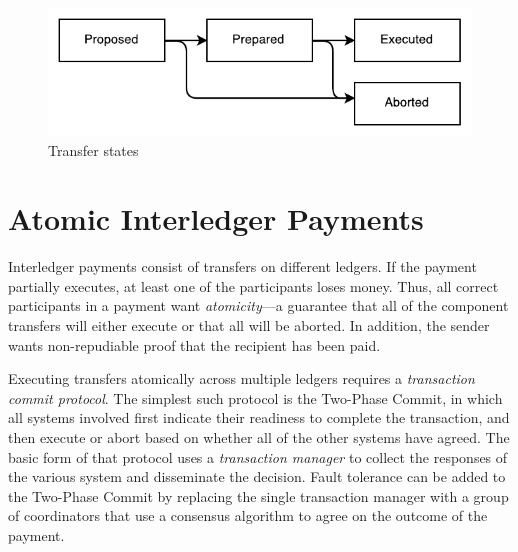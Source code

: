 \documentclass[letterpaper,twocolumn,10pt]{article}
\begin{document}
\begin{figure}[ht]
    \centering
    \includegraphics[width=\columnwidth]{figures/transfer-states.pdf}
    \caption{Transfer states}
    \label{fig:transfer-states}
\end{figure}


\section{Atomic Interledger Payments}
\label{sec:atomic}




Interledger payments consist of transfers on different ledgers. If the payment partially executes, at least one of the participants loses money. Thus, all correct participants in a payment want \textit{atomicity}---a guarantee that all of the component transfers will either execute or that all will be aborted. In addition, the sender wants non-repudiable proof that the recipient has been paid.

Executing transfers atomically across multiple ledgers requires a \textit{transaction commit protocol}. The simplest such protocol is the Two-Phase Commit, in which all systems involved first indicate their readiness to complete the transaction, and then execute or abort based on whether all of the other systems have agreed. The basic form of that protocol uses a \textit{transaction manager} to collect the responses of the various system and disseminate the decision. Fault tolerance can be added to the Two-Phase Commit by replacing the single transaction manager with a group of coordinators that use a consensus algorithm to agree on the outcome of the payment. \cite{gray2006consensus}
\end{document}
